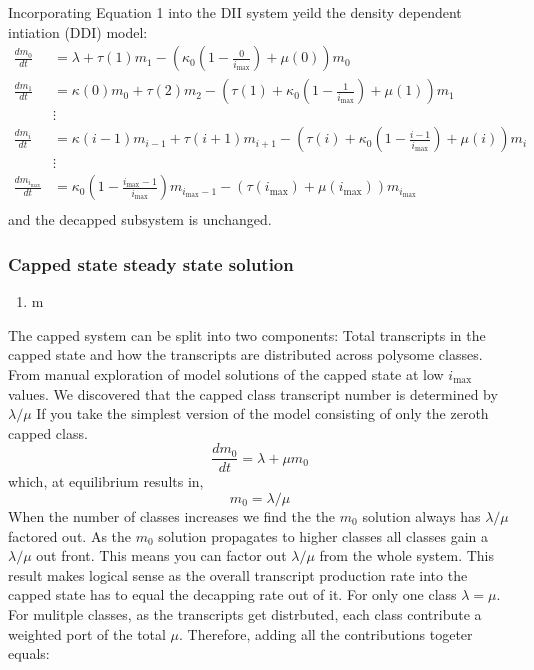 \documentclass[review]{elsarticle}
\newcommand{\imax}{\ensuremath{{i_{\max}}}\xspace}
\begin{document}
Incorporating Equation 1 into the DII system yeild the density dependent intiation (DDI) model: %
\begin{align*}
\frac{dm_{0}}{dt} &= \lambda+\tau(1)m_{1}-\left(\kappa_0\left(1-\frac{0}{\imax}\right) + \mu(0)\right)m_{0} \\
\frac{dm_{1}}{dt} &= \kappa(0)m_{0}+\tau(2)m_{2}-\left(\tau(1)+\kappa_0\left(1-\frac{1}{\imax}\right)+\mu(1)\right) m_{1}\\
& \vdots & \\
\frac{dm_{i}}{dt} &= \kappa(i-1)m_{i-1}+\tau(i+1)m_{i+1}-\left(\tau(i)+\kappa_0\left(1-\frac{i-1}{\imax}\right)+\mu(i)\right) m_{i} \\
& \vdots & \\
\frac{dm_{\imax}}{dt} &= \kappa_0\left(1-\frac{\imax-1}{\imax}\right)m_{\imax-1}-\left(\tau(\imax)+\mu(\imax)\right) m_{\imax}\\
\end{align*}
and the decapped subsystem is unchanged.

\subsubsection{Capped state steady state solution}
\begin{enumerate}
	\item m


\end{enumerate}






The capped system can be split into two components: Total transcripts in the capped state and how the transcripts are distributed across polysome classes. 
From manual exploration of model solutions of the capped state at low \imax values. 
We discovered that the capped class transcript number is determined by $\lambda/ \mu$
If you take the simplest version of the model consisting of only the zeroth capped class.
	\begin{equation} 
		\frac{dm_{0}}{dt} = \lambda + \mu m_{0}
	\end{equation}
which, at equilibrium results in,
	\begin{equation}
		m_{0} = \lambda/\mu
	\end{equation}
When the number of classes increases we find the the $m_{0}$ solution always has $\lambda/ \mu$ factored out. As the $m_{0}$ solution propagates to higher classes all classes gain a $\lambda/ \mu$ out front.
This means you can factor out $\lambda/ \mu$ from the whole system. 
This result makes logical sense as the overall transcript production rate into the capped state has to equal the decapping rate out of it. For only one class $\lambda = \mu$. 
For mulitple classes, as the transcripts get distrbuted, each class contribute a weighted port of the total $\mu$. Therefore, adding all the contributions togeter equals:
\end{document}
